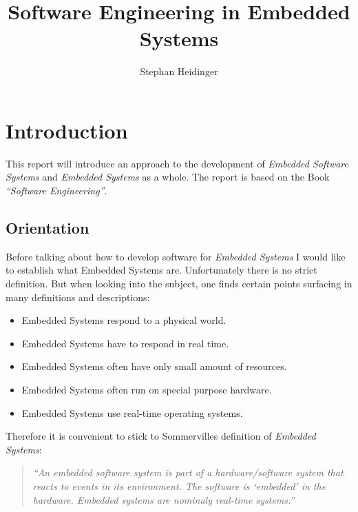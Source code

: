 \documentclass[10pt,a4paper,titlepage,draft]{article} %
\author{Stephan Heidinger}
\title{Software Engineering in Embedded Systems}
\begin{document}
\maketitle

\pagestyle{empty}
\tableofcontents
\newpage
\pagestyle{plain}
\setcounter{page}{1} %


\section{Introduction}

This report will introduce an approach to the development of \emph{Embedded Software Systems} and \emph{Embedded Systems} as a whole. The report is based on the Book \textit{``Software Engineering''}\cite[chapter 20]{sommerville}.

\subsection{Orientation}
Before talking about how to develop software for \emph{Embedded Systems} I would like to establish what Embedded Systems are.
Unfortunately there is no strict definition.
But when looking into the subject, one finds certain points surfacing in many definitions and descriptions:
\begin{itemize}
	\item Embedded Systems respond to a physical world.
	\item Embedded Systems have to respond in real time.
	\item Embedded Systems often have only small amount of resources.
	\item Embedded Systems often run on special purpose hardware.
	\item Embedded Systems use real-time operating systems.
\end{itemize}
Therefore it is convenient to stick to Sommervilles definition of \emph{Embedded Systems}:
\begin{quote}
\textit{``An \emph{embedded software system} is part of a hardware/software system that reacts to events in its environment.
The software is ‘embedded’ in the hardware.
Embedded systems are nominaly real-time systems.'' \cite[p. 561]{sommerville} }
\end{quote}
\end{document}
